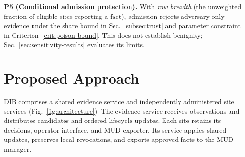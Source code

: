 \documentclass[journal]{IEEEtran}
\theoremstyle{definition}
\begin{document}
\textbf{P5 (Conditional admission protection).} With \emph{raw breadth} (the unweighted fraction of eligible sites reporting a fact), admission rejects adversary-only evidence under the share bound in Sec.~\ref{subsec:trust} and parameter constraint in Criterion~\ref{crit:poison-bound}. This does not establish benignity; Sec.~\ref{sec:sensitivity-results} evaluates its limits.

\section{Proposed Approach}
\label{sec:design}
DIB comprises a shared evidence service and independently administered site services (Fig.~\ref{fig:architecture}). The evidence service receives observations and distributes candidates and ordered lifecycle updates. Each site retains its decisions, operator interface, and MUD exporter. Its service applies shared updates, preserves local revocations, and exports approved facts to the MUD manager.
\end{document}
